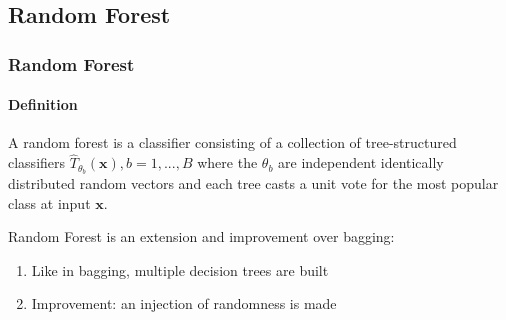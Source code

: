 \subsection{Random Forest}

\begin{frame}
\frametitle{Random Forest}
\framesubtitle{Definition}


\vspace{1ex}


\begin{definition}
	A random forest is a classifier consisting of a collection of tree-structured classifiers ${\hat{T}_{\theta_{b}}(\textbf{x})}, b = 1,...,B$ where the $\theta_{b}$ are independent identically
	distributed random vectors and each tree casts a unit vote for the most popular class at input $\textbf{x}$.
\end{definition}
\vspace{4ex}

Random Forest is an extension and improvement over bagging:
\vspace{1ex}
\begin{enumerate}
\item Like in bagging, multiple decision trees are built
\vspace{1ex}
\item Improvement: an injection of randomness is made
\end{enumerate}

\end{frame}


